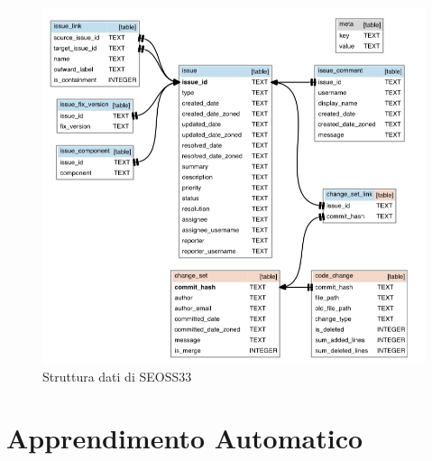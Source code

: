 \documentclass[%
    corpo=12pt,
    twoside,
    oldstyle,
    autoretitolo,
    greek,
    evenboxes,
]{toptesi}
\begin{document}
\begin{figure}[!ht]
  \includegraphics[width=\linewidth]{figure/seoss33_db_schema.png}
  \caption{Struttura dati di SEOSS33}
  \label{fig:seoss33_db}
\end{figure}



\chapter{Apprendimento Automatico}
\label{chap:ml}
\end{document}
